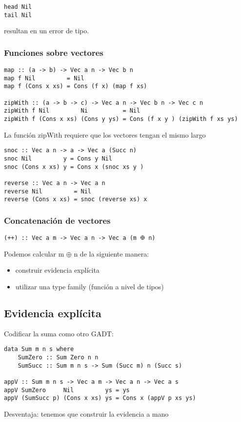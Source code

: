 \documentclass{article}
\newcommand{\imp}[1]{\textcolor{color1}{#1}}
\begin{document}
\begin{lstlisting}
head Nil
tail Nil
\end{lstlisting}

resultan en un error de tipo.

\subsubsection{Funciones sobre vectores}

\begin{lstlisting}
map :: (a -> b) -> Vec a n -> Vec b n
map f Nil         = Nil
map f (Cons x xs) = Cons (f x) (map f xs)

zipWith :: (a -> b -> c) -> Vec a n -> Vec b n -> Vec c n
zipWith f Nil         Ni          = Nil
zipWith f (Cons x xs) (Cons y ys) = Cons (f x y ) (zipWith f xs ys)
\end{lstlisting}
La función zipWith requiere que los vectores tengan el mismo largo

\begin{lstlisting}
snoc :: Vec a n -> a -> Vec a (Succ n)
snoc Nil         y = Cons y Nil
snoc (Cons x xs) y = Cons x (snoc xs y )

reverse :: Vec a n -> Vec a n
reverse Nil         = Nil
reverse (Cons x xs) = snoc (reverse xs) x
\end{lstlisting}

\subsubsection{Concatenación de vectores}

\begin{lstlisting}
(++) :: Vec a m -> Vec a n -> Vec a (m 𐃏 n)
\end{lstlisting}
Podemos calcular m $\oplus$ n de la siguiente manera:
\begin{itemize}
\item construir \imp{evidencia explícita}
\item utilizar una \imp{type family} (función a nivel de tipos)
\end{itemize}

\subsection{Evidencia explícita}

Codificar la suma como otro GADT:

\begin{lstlisting}
data Sum m n s where
    SumZero :: Sum Zero n n
    SumSucc :: Sum m n s -> Sum (Succ m) n (Succ s)

appV :: Sum m n s -> Vec a m -> Vec a n -> Vec a s
appV SumZero     Nil         ys = ys
appV (SumSucc p) (Cons x xs) ys = Cons x (appV p xs ys)
\end{lstlisting}
Desventaja: tenemos que construir la evidencia a mano
\end{document}
